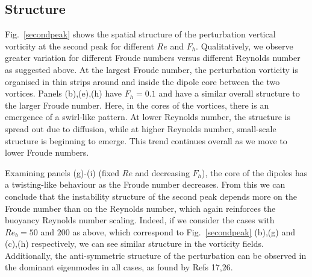 \subsection{Structure} 
Fig.~\ref{secondpeak} shows the spatial structure of the perturbation vertical vorticity at the second peak for different $Re$ and $F_{h}$. Qualitatively, we observe greater variation for different Froude numbers versus different Reynolds number as suggested above.  At the largest Froude number, the perturbation vorticity is organised in thin strips around and inside the dipole core between the two vortices. Panels (b),(e),(h) have $F_{h}=0.1$ and have a similar overall structure to the larger Froude number. Here, in the cores of the vortices, there is an emergence of a swirl-like pattern. At lower Reynolds number, the structure is spread out due to diffusion, while at higher Reynolds number, small-scale structure is beginning to emerge. This trend continues overall as we move to lower Froude numbers. 

Examining panels (g)-(i) (fixed $Re$ and decreasing $F_{h}$), the core of the dipoles has a twisting-like behaviour as the Froude number decreases. From this we can conclude that the instability structure of the second peak depends more on the Froude number than on the Reynolds number, which again reinforces the buoyancy Reynolds number scaling.  Indeed, if we consider the cases with $Re_{b}=50$ and $200$ as above, which correspond to Fig.~\ref{secondpeak} (b),(g) and (c),(h) respectively, we can see similar structure in the vorticity fields. Additionally, the anti-symmetric structure of the perturbation can be observed in the dominant eigenmodes in all cases, as found by Refs 17,26\nocite{bc1999,bc2000c}.


